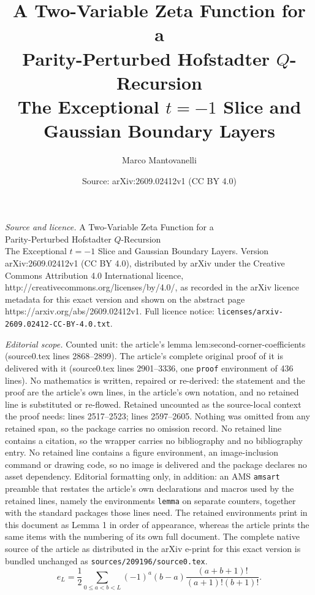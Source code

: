 \documentclass[10pt,a4paper]{amsart}
\title{A Two-Variable Zeta Function for a\\ Parity-Perturbed Hofstadter \texorpdfstring{$Q$}{Q}-Recursion\\[1.5mm] \large The Exceptional \texorpdfstring{$t=-1$}{t=-1} Slice and Gaussian Boundary Layers}
\author{Marco Mantovanelli}
\date{Source: arXiv:2609.02412v1 (CC BY 4.0)}
\begin{document}
\maketitle

\noindent\emph{Source and licence.} A Two-Variable Zeta Function for a\\ Parity-Perturbed Hofstadter \texorpdfstring{$Q$}{Q}-Recursion\\[1.5mm] \large The Exceptional \texorpdfstring{$t=-1$}{t=-1} Slice and Gaussian Boundary Layers. Version arXiv:2609.02412v1 (CC BY 4.0), distributed by arXiv under the Creative Commons Attribution 4.0 International licence, http://creativecommons.org/licenses/by/4.0/, as recorded in the arXiv licence metadata for this exact version and shown on the abstract page https://arxiv.org/abs/2609.02412v1. Full licence notice: \texttt{licenses/arxiv-2609.02412-CC-BY-4.0.txt}.\par\smallskip

\noindent\textit{Editorial scope.} Counted unit: the article's lemma lem:second-corner-coefficients (source0.tex lines 2868--2899). The article's complete original proof of it is delivered with it (source0.tex lines 2901--3336, one \texttt{proof} environment of 436 lines). No mathematics is written, repaired or re-derived: the statement and the proof are the article's own lines, in the article's own notation, and no retained line is substituted or re-flowed.  Retained uncounted as the source-local context the proof needs: lines 2517--2523; lines 2597--2605.  Nothing was omitted from any retained span, so the package carries no omission record.  No retained line contains a citation, so the wrapper carries no bibliography and no bibliography entry.  No retained line contains a figure environment, an image-inclusion command or drawing code, so no image is delivered and the package declares no asset dependency.  Editorial formatting only, in addition: an AMS \texttt{amsart} preamble that restates the article's own declarations and macros used by the retained lines, namely the environments \texttt{lemma} on separate counters, together with the standard packages those lines need.  The retained environments print in this document as Lemma 1 in order of appearance, whereas the article prints the same items with the numbering of its own full document.  The complete native source of the article as distributed in the arXiv e-print for this exact version is bundled unchanged as \texttt{sources/209196/source0.tex}.
\begin{equation}
 e_L
 =\frac12\sum_{0\le a<b<L}
 (-1)^a(b-a)
 \frac{(a+b+1)!}{(a+1)!(b+1)!}.
 \label{eq:eL-exact}
\end{equation}
\end{document}
